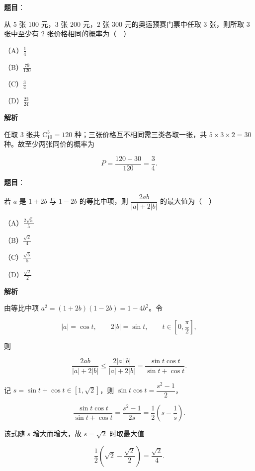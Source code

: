 \begin{answer}

\textbf{题目}：

从 $5$ 张 $100$ 元，$3$ 张 $200$ 元，$2$ 张 $300$ 元的奥运预赛门票中任取 $3$ 张，则所取 $3$ 张中至少有 $2$ 张价格相同的概率为（　）

（A）$\frac14$

（B）$\frac{79}{120}$

（C）$\frac34$

（D）$\frac{23}{24}$

\textbf{解析}

任取 $3$ 张共 $\mathrm C_{10}^3=120$ 种；三张价格互不相同需三类各取一张，共 $5\times3\times2=30$ 种。故至少两张同价的概率为

\nopagebreak[4]
\[P=\frac{120-30}{120}=\frac34.\]


\end{answer}
\begin{answer}

\textbf{题目}：

若 $a$ 是 $1+2b$ 与 $1-2b$ 的等比中项，则 $\dfrac{2ab}{|a|+2|b|}$ 的最大值为（　）

（A）$\frac{2\sqrt5}{5}$

（B）$\frac{\sqrt2}{4}$

（C）$\frac{\sqrt5}{5}$

（D）$\frac{\sqrt2}{2}$

\textbf{解析}

由等比中项 $a^2=(1+2b)(1-2b)=1-4b^2$。令

\nopagebreak[4]
\[|a|=\cos t,\qquad 2|b|=\sin t,\qquad t\in\left[0,\frac{\pi}2\right],\]

则

\nopagebreak[4]
\[\frac{2ab}{|a|+2|b|}\leqslant\frac{2|a||b|}{|a|+2|b|}=\frac{\sin t\cos t}{\sin t+\cos t}.\]

记 $s=\sin t+\cos t\in[1,\sqrt2]$，则 $\sin t\cos t=\dfrac{s^2-1}2$，

\nopagebreak[4]
\[\frac{\sin t\cos t}{\sin t+\cos t}=\frac{s^2-1}{2s}=\frac12\left(s-\frac1s\right).\]

该式随 $s$ 增大而增大，故 $s=\sqrt2$ 时取最大值

\nopagebreak[4]
\[\frac12\left(\sqrt2-\frac{\sqrt2}2\right)=\frac{\sqrt2}4.\]


\end{answer}
